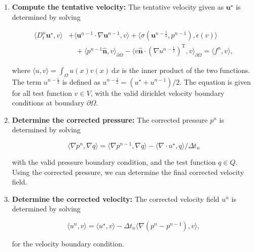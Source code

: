 	\begin{enumerate}
	\item \textbf{Compute the tentative velocity:} The tentative velocity given as $\mathbf{u}^{\star}$ is determined by solving
	
		\begin{equation}
		\begin{split}
		\langle D_t^n \mathbf{u}^{\star}, v \rangle &+ \langle \mathbf{u}^{n-1}\cdot\nabla\mathbf{u}^{n-1},v\rangle + \langle \sigma(\mathbf{u}^{n-\frac{1}{2}},p^{n-1}), \epsilon(v) \rangle \quad \\ &\quad+ \langle p^{n-1}\hat{\mathbf{n}},v\rangle_{\partial \Omega} - \langle v\hat{\mathbf{n}} \cdot (\nabla u^{n-\frac{1}{2}} )^{\mathrm{T}},v \rangle_{\partial \Omega} = \langle f^n,v \rangle,
		\end{split}
		\end{equation}
		
	where $\langle u,v \rangle = \int_{\Omega} u(x)v(x)\ \mathrm{d}x$ is the inner product of the two functions. The term $u^{n-\frac{1}{2}}$ is defined as $u^{n-\frac{1}{2}} = (u^{\star}+u^{n-1})/2$. The equation is given for all test function $v \in V$, with the valid dirichlet velocity boundary conditions at boundary $\partial \Omega$.
	
	\item \textbf{Determine the corrected pressure:} The corrected pressure $p^n$ is determined by solving
	
		\begin{equation}
		\langle \nabla p^n, \nabla q \rangle = \langle \nabla p^{n-1}, \nabla q\rangle - \langle \nabla \cdot u^{\star}, q \rangle / \Delta t_n
		\end{equation}
	
	with the valid pressure boundary condition, and the test function $q \in Q$. Using the corrected pressure, we can determine the final corrected velocity field. 
		
	\item \textbf{Determine the corrected velocity:} The corrected velocity field $u^n$ is determined by solving
	
		\begin{equation}
		\langle u^n, v\rangle = \langle u^{\star},v \rangle - \Delta t_n \langle \nabla(p^n - p^{n-1}),v \rangle,
		\end{equation}
		
	for the velocity boundary condition.
		
	\end{enumerate}
	

